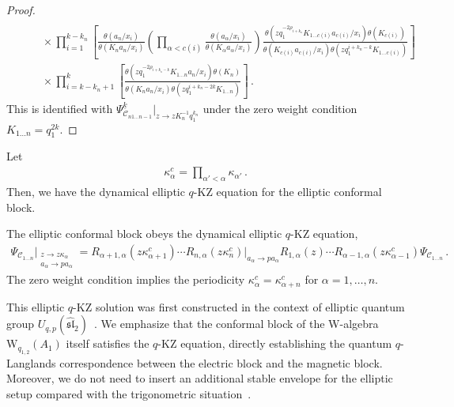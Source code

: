 \begin{proof}
\begin{align}
    \nonumber \\
    & \qquad \times
    \prod_{i=1}^{k-k_n} \left[ \frac{\theta(a_n/x_i)}{\theta(K_n a_n/x_i)} \left( \prod_{\alpha < c(i)} \frac{\theta(a_\alpha/x_i)}{\theta(K_\alpha a_\alpha / x_i)} \right) \frac{\theta(z q_1^{-2\rho_{i+k_n}} K_{1\ldots c(i)} a_{c(i)}/x_i) \theta(K_{c(i)})}{\theta(K_{c(i)} a_{c(i)} / x_i) \theta(z q_1^{i+k_n-k} K_{1\ldots c(i)})} \right]
    \nonumber \\
    & \qquad \times 
    \prod_{i=k-k_n+1}^{k}
    \left[ \frac{\theta(z q_1^{-2\rho_{i+k_n-k}} K_{1\ldots n} a_{n}/x_i) \theta(K_{n})}{\theta(K_{n} a_{n} / x_i) \theta(z q_1^{i+k_n-2k} K_{1\ldots n})} \right]
    \, .
\end{align}
This is identified with $\Psi_{\mathscr{C}_{n1\ldots n-1}}^{\underline{k}}\Big|_{z \to z K_n^{-1} q_1^{k_n}}$ under the zero weight condition $K_{1\ldots n} = q_1^{2k}$.
\end{proof}


Let
\begin{align}
    \kappa_\alpha^c = \prod_{\alpha' < \alpha} \kappa_{\alpha'}
    \, .
\end{align}
Then, we have the dynamical elliptic $q$-KZ equation for the elliptic conformal block.    
\begin{theorem}\label{thm:e_qKZ}
    The elliptic conformal block obeys the dynamical elliptic $q$-KZ equation,
    \begin{align}
        \Psi_{\mathscr{C}_{1\ldots n}}\Big|_{\substack{z \to z \kappa_\alpha \\ a_\alpha \to p a_\alpha}} = R_{\alpha+1,\alpha}(z \kappa^c_{\alpha+1}) \cdots R_{n,\alpha} (z \kappa^c_{n})\Big|_{a_\alpha \to p a_\alpha} R_{1,\alpha} (z) \cdots R_{\alpha-1,\alpha} (z \kappa^c_{\alpha-1}) \Psi_{\mathscr{C}_{1\ldots n}}
        \, .
    \end{align}
    The zero weight condition implies the periodicity $\kappa_{\alpha}^c = \kappa_{\alpha+n}^c$ for $\alpha = 1,\ldots,n$.
\end{theorem}
This elliptic $q$-KZ solution was first constructed in the context of elliptic quantum group $U_{q,p}(\widehat{\mathfrak{sl}}_2)$~\cite{Foda:1993fg,Felder:1994pb,Konno:2017mos}.
We emphasize that the conformal block of the W-algebra $\mathrm{W}_{q_{1,2}}(A_1)$ itself satisfies the $q$-KZ equation, directly establishing the quantum $q$-Langlands correspondence between the electric block and the magnetic block.
Moreover, we do not need to insert an additional stable envelope for the elliptic setup compared with the trigonometric situation~\cite{Aganagic:2016jmx}.

